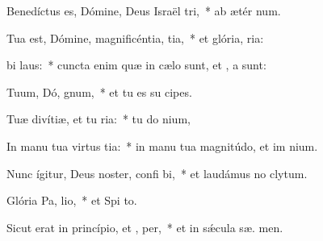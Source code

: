 \item Benedíctus es, Dómine, Deus Israël  tri,~* ab ætér  num.
\item Tua est, Dómine, magnificéntia,  tia,~* et glória,  ria:
\item {} bi laus:~* cuncta enim quæ in cælo sunt, et  , a sunt:
\item Tuum, Dó, gnum,~* et tu es su  cipes.
\item Tuæ divítiæ, et tu  ria:~* tu do nium,
\item In manu tua virtus  tia:~* in manu tua magnitúdo, et im nium.
\item Nunc ígitur, Deus noster, confi bi,~* et laudámus no  clytum.
\item Glória Pa,  lio,~* et Spi to.
\item Sicut erat in princípio, et ,  per,~* et in sǽcula sæ. men.
